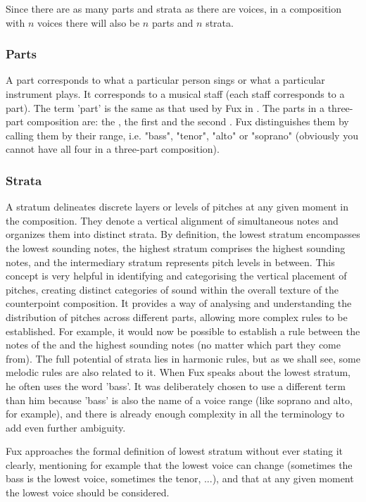 Since there are as many parts and strata as there are voices, in a composition with $n$ voices there will also be $n$ parts and $n$ strata.

\subsubsection{Parts}
A part corresponds to what a particular person sings or what a particular instrument plays. It corresponds to a musical staff (each staff corresponds to a part). The term 'part' is the same as that used by Fux in \gap. The parts in a three-part composition are: the \cf, the first \cps and the second \cp. Fux distinguishes them by calling them by their range, i.e. "bass", "tenor", "alto" or "soprano" (obviously you cannot have all four in a three-part composition).

\subsubsection{Strata}
A stratum delineates discrete layers or levels of pitches at any given moment in the composition. They denote a vertical alignment of simultaneous notes and organizes them into distinct strata. By definition, the lowest stratum encompasses the lowest sounding notes, the highest stratum comprises the highest sounding notes, and the intermediary stratum represents pitch levels in between.
This concept is very helpful in identifying and categorising the vertical placement of pitches, creating distinct categories of sound within the overall texture of the counterpoint composition. It provides a way of analysing and understanding the distribution of pitches across different parts, allowing more complex rules to be established. For example, it would now be possible to establish a rule between the notes of the \cfs and the highest sounding notes (no matter which part they come from). The full potential of strata lies in harmonic rules, but as we shall see, some melodic rules are also related to it.
When Fux speaks about the lowest stratum, he often uses the word 'bass'. It was deliberately chosen to use a different term than him because 'bass' is also the name of a voice range (like soprano and alto, for example), and there is already enough complexity in all the terminology to add even further ambiguity.

Fux approaches the formal definition of lowest stratum without ever stating it clearly, mentioning for example that the lowest voice can change (sometimes the bass is the lowest voice, sometimes the tenor, ...), and that at any given moment the lowest voice should be considered. 

